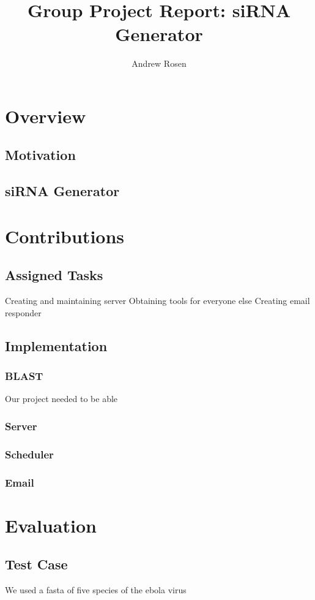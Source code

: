 \documentclass[10pt,letterpaper]{article}
\author{Andrew Rosen}
\title{Group Project Report: siRNA Generator}
\date{}
\begin{document}
\maketitle

\section{Overview}


\subsection{Motivation}

\subsection{siRNA  Generator}


\section{Contributions}




\subsection{Assigned Tasks}




Creating and maintaining server
Obtaining tools for everyone else
Creating email responder

\subsection{Implementation}

\subsubsection{BLAST}

Our project needed to be able 


\subsubsection{Server}

\subsubsection{Scheduler}

\subsubsection{Email}




\section{Evaluation}

\subsection{Test Case}
We used a fasta of five species of the ebola virus



\end{document}
